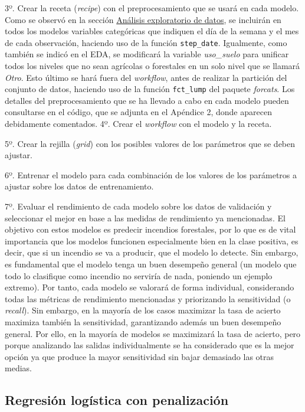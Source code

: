 \documentclass[12pt,a4paper,]{book}
\numberwithin{dummy}{section}
\theoremstyle{ocrenumbox}
\theoremstyle{blacknumex}
\theoremstyle{blacknumbox}
\theoremstyle{ocrenum}
\theoremstyle{ocrenum}
\begin{document}
3º. Crear la receta (\emph{recipe}) con el preprocesamiento que se usará
en cada modelo. Como se observó en la sección
\protect\hyperlink{anuxe1lisis-exploratorio-de-datos}{Análisis
exploratorio de datos}, se incluirán en todos los modelos variables
categóricas que indiquen el día de la semana y el mes de cada
observación, haciendo uso de la función \texttt{step\_date}. Igualmente,
como también se indicó en el EDA, se modificará la variable
\emph{uso\_suelo} para unificar todos los niveles que no sean agrícolas
o forestales en un solo nivel que se llamará \emph{Otro}. Esto último se
hará fuera del \emph{workflow}, antes de realizar la partición del
conjunto de datos, haciendo uso de la función \texttt{fct\_lump} del
paquete \emph{forcats}. Los detalles del preprocesamiento que se ha
llevado a cabo en cada modelo pueden consultarse en el código, que se
adjunta en el Apéndice 2, donde aparecen debidamente comentados. 4º.
Crear el \emph{workflow} con el modelo y la receta.

5º. Crear la rejilla (\emph{grid}) con los posibles valores de los
parámetros que se deben ajustar.

6º. Entrenar el modelo para cada combinación de los valores de los
parámetros a ajustar sobre los datos de entrenamiento.

7º. Evaluar el rendimiento de cada modelo sobre los datos de validación
y seleccionar el mejor en base a las medidas de rendimiento ya
mencionadas. El objetivo con estos modelos es predecir incendios
forestales, por lo que es de vital importancia que los modelos funcionen
especialmente bien en la clase positiva, es decir, que si un incendio se
va a producir, que el modelo lo detecte. Sin embargo, es fundamental que
el modelo tenga un buen desempeño general (un modelo que todo lo
clasifique como incendio no serviría de nada, poniendo un ejemplo
extremo). Por tanto, cada modelo se valorará de forma individual,
considerando todas las métricas de rendimiento mencionadas y priorizando
la sensitividad (o \emph{recall}). Sin embargo, en la mayoría de los
casos maximizar la tasa de acierto maximiza también la sensitividad,
garantizando además un buen desempeño general. Por ello, en la mayoría
de modelos se maximizará la tasa de acierto, pero porque analizando las
salidas individualmente se ha considerado que es la mejor opción ya que
produce la mayor sensitividad sin bajar demasiado las otras medias.

\hypertarget{regresiuxf3n-loguxedstica-con-penalizaciuxf3n}{%
\subsection{Regresión logística con
penalización}\label{regresiuxf3n-loguxedstica-con-penalizaciuxf3n}}
\end{document}
